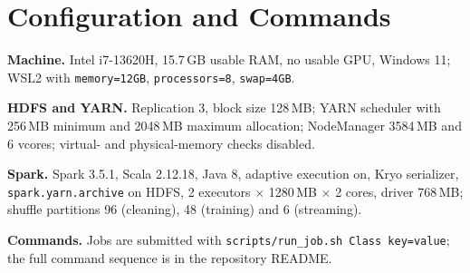 \documentclass[10pt,journal]{IEEEtran}
\begin{document}
\appendices
\section{Configuration and Commands}
\textbf{Machine.} Intel i7-13620H, 15.7\,GB usable RAM, no usable GPU, Windows 11; WSL2 with \texttt{memory=12GB}, \texttt{processors=8}, \texttt{swap=4GB}.

\textbf{HDFS and YARN.} Replication 3, block size 128\,MB; YARN scheduler with 256\,MB minimum and 2048\,MB maximum allocation; NodeManager 3584\,MB and 6 vcores; virtual- and physical-memory checks disabled.

\textbf{Spark.} Spark 3.5.1, Scala 2.12.18, Java 8, adaptive execution on, Kryo serializer, \texttt{spark.yarn.archive} on HDFS, 2 executors $\times$ 1280\,MB $\times$ 2 cores, driver 768\,MB; shuffle partitions 96 (cleaning), 48 (training) and 6 (streaming).

\textbf{Commands.} Jobs are submitted with \texttt{scripts/run\_job.sh Class key=value}; the full command sequence is in the repository README.
\end{document}
